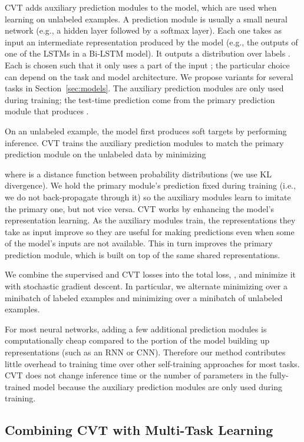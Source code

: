 \documentclass[11pt,a4paper]{article}
\begin{document}
CVT adds  auxiliary prediction modules to the model, which are used when learning on unlabeled examples.
A prediction module is usually a small neural network (e.g., a hidden layer followed by a softmax layer). 
Each one takes as input an intermediate representation  produced by the model (e.g., the outputs of one of the LSTMs in a Bi-LSTM model).
It outputs a distribution over labels .
Each  is chosen such that it only uses a part of the input ; the particular choice can depend on the task and model architecture.
We propose variants for several tasks in Section~\ref{sec:models}. 
The auxiliary prediction modules are only used during training; the test-time prediction come from the primary prediction module that produces .

On an unlabeled example, the model first produces soft targets  by performing inference. 
CVT trains the auxiliary prediction modules to match the primary prediction module on the unlabeled data by minimizing

where  is a distance function between probability distributions  (we use KL divergence).
We hold the primary module's prediction  fixed during training (i.e., we do not back-propagate through it) so the auxiliary modules learn to imitate the primary one, but not vice versa. CVT works by enhancing the model's representation learning. As the auxiliary modules train, the representations they take as input improve so they are useful for making predictions even when some of the model's inputs are not available.
This in turn improves the primary prediction module, which is built on top of the same shared representations.

We combine the supervised and CVT losses into the total loss, , and minimize it with stochastic gradient descent. 
In particular, we alternate minimizing  over a minibatch of labeled examples and minimizing  over a minibatch of unlabeled examples.

For most neural networks, adding a few additional prediction modules is computationally cheap compared to the portion of the model building up representations (such as an RNN or CNN).
Therefore our method contributes little overhead to training time over other self-training approaches for most tasks. CVT does not change inference time or the number of parameters in the fully-trained model because the auxiliary prediction modules are only used during training. 

\subsection{Combining CVT with Multi-Task Learning}
\end{document}
